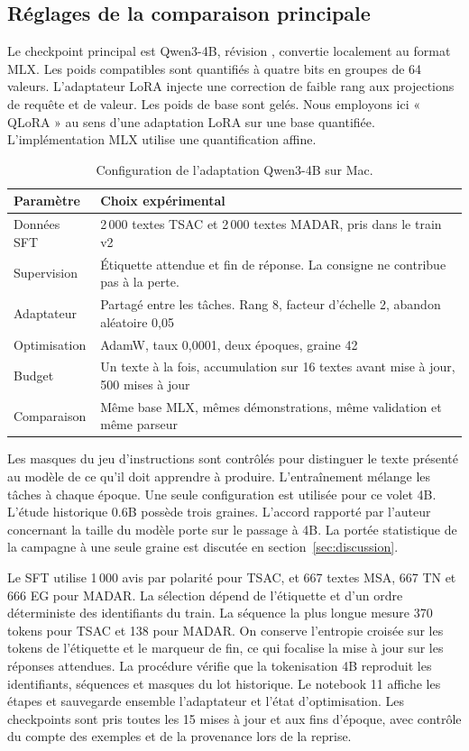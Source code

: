 \subsection{Réglages de la comparaison principale}
Le checkpoint principal est Qwen3-4B, révision , convertie localement au format MLX. Les poids compatibles sont quantifiés à quatre bits en groupes de 64 valeurs. L’adaptateur LoRA injecte une correction de faible rang aux projections de requête et de valeur. Les poids de base sont gelés. Nous employons ici « QLoRA » au sens d’une adaptation LoRA sur une base quantifiée. L’implémentation MLX utilise une quantification affine.

\begin{table}[htbp]
\centering\small
\caption{Configuration de l’adaptation Qwen3-4B sur Mac.}\label{tab:setup}
\begin{tabularx}{\linewidth}{@{}lY@{}}
\toprule
Paramètre & Choix expérimental \\
\midrule
Données SFT & 2\,000 textes TSAC et 2\,000 textes MADAR, pris dans le train v2 \\
Supervision & Étiquette attendue et fin de réponse. La consigne ne contribue pas à la perte. \\
Adaptateur & Partagé entre les tâches. Rang 8, facteur d’échelle 2, abandon aléatoire 0,05 \\
Optimisation & AdamW, taux 0,0001, deux époques, graine 42 \\
Budget & Un texte à la fois, accumulation sur 16 textes avant mise à jour, 500 mises à jour \\
Comparaison & Même base MLX, mêmes démonstrations, même validation et même parseur \\
\bottomrule
\end{tabularx}
\end{table}

Les masques du jeu d’instructions sont contrôlés pour distinguer le texte présenté au modèle de ce qu’il doit apprendre à produire. L’entraînement mélange les tâches à chaque époque. Une seule configuration est utilisée pour ce volet 4B. L’étude historique 0.6B possède trois graines. L’accord rapporté par l’auteur concernant la taille du modèle porte sur le passage à 4B. La portée statistique de la campagne à une seule graine est discutée en section~\ref{sec:discussion}.

Le SFT utilise 1\,000 avis par polarité pour TSAC, et 667 textes MSA, 667 TN et 666 EG pour MADAR. La sélection dépend de l’étiquette et d’un ordre déterministe des identifiants du train. La séquence la plus longue mesure 370 tokens pour TSAC et 138 pour MADAR. On conserve l’entropie croisée sur les tokens de l’étiquette et le marqueur de fin, ce qui focalise la mise à jour sur les réponses attendues. La procédure vérifie que la tokenisation 4B reproduit les identifiants, séquences et masques du lot historique. Le notebook 11 affiche les étapes et sauvegarde ensemble l’adaptateur et l’état d’optimisation. Les checkpoints sont pris toutes les 15 mises à jour et aux fins d’époque, avec contrôle du compte des exemples et de la provenance lors de la reprise.

